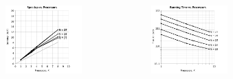 \documentclass[handout]{beamer}
\begin{document}
\begin{frame}
\begin{columns}
\begin{figure}
	\end{figure}
\begin{minipage}[c][.6\textheight][c]{\linewidth}
	\vspace{-1em}
	\begin{figure}
	\centering
	\includegraphics[scale = 0.25]{ge_speed_3.png}
	\end{figure}
	\vspace{-2em}
	\begin{figure}
	\centering
	\includegraphics[scale = 0.25]{ge_speed_4.png}
	\end{figure}
\end{minipage}
\end{columns}
\end{frame}
\end{document}
